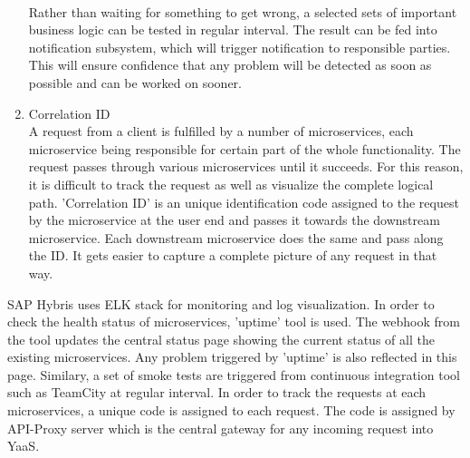 \begin{enumerate}
\\
Rather than waiting for something to get wrong, a selected sets of important business logic can be tested in regular interval. The result can be fed into notification subsystem, which will trigger notification to responsible parties. This will ensure confidence that any problem will be detected as soon as possible and can be worked on sooner. \cite{Simone:2014aa} \cite{Newman:2015aa}
\item Correlation ID \\
A request from a client is fulfilled by a number of microservices, each microservice being responsible for certain part of the whole functionality. The request passes through various microservices until it succeeds. For this reason, it is difficult to track the request as well as visualize the complete logical path. 'Correlation ID' is an unique identification code assigned to the request by the microservice at the user end and passes it towards the downstream microservice. Each downstream microservice does the same and pass along the ID. It gets easier to capture a complete picture of any request in that way.
\end{enumerate}
\begin{shaded}
SAP Hybris uses ELK stack for monitoring and log visualization. In order to check the health status of microservices, 'uptime' tool is used. The webhook from the tool updates the central status page showing the current status of all the existing microservices. Any problem triggered by 'uptime' is also reflected in this page. Similary, a set of smoke tests are triggered from continuous integration tool such as TeamCity at regular interval. In order to track the requests at each microservices, a unique code is assigned to each request. The code is assigned by API-Proxy server which is the central gateway for any incoming request into \acrshort{YaaS}.
\end{shaded}

